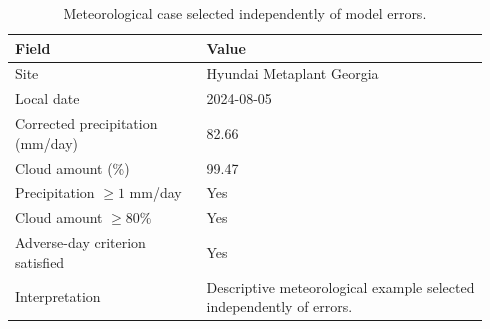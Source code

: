 \begin{table}[!htbp]
\centering
\footnotesize
\caption{Meteorological case selected independently of model errors.}
\label{tab:caso-meteorologico-independente}
\begin{tabular}{@{}p{0.38\linewidth}p{0.56\linewidth}@{}}
\toprule
\textbf{Field} & \textbf{Value} \\
\midrule
Site & Hyundai Metaplant Georgia \\
Local date & 2024-08-05 \\
Corrected precipitation (mm/day) & 82.66 \\
Cloud amount (\%) & 99.47 \\
Precipitation $\geq 1$ mm/day & Yes \\
Cloud amount $\geq 80\%$ & Yes \\
Adverse-day criterion satisfied & Yes \\
Interpretation & Descriptive meteorological example selected independently of errors. \\
\bottomrule
\end{tabular}
\end{table}
